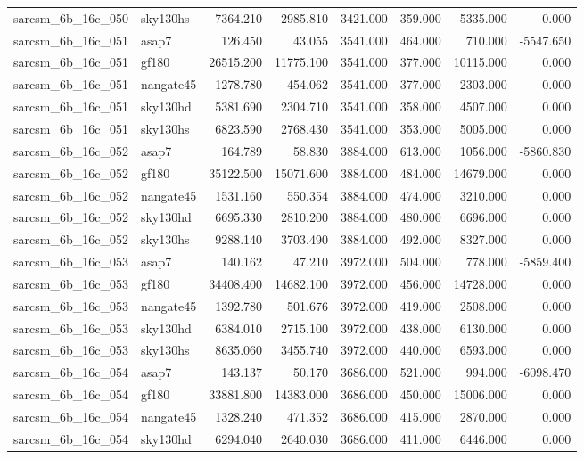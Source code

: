\begin{tabular}{llrrrrrr}
sarcsm\_6b\_16c\_050 & sky130hs & 7364.210 & 2985.810 & 3421.000 & 359.000 & 5335.000 & 0.000 \\
sarcsm\_6b\_16c\_051 & asap7 & 126.450 & 43.055 & 3541.000 & 464.000 & 710.000 & -5547.650 \\
sarcsm\_6b\_16c\_051 & gf180 & 26515.200 & 11775.100 & 3541.000 & 377.000 & 10115.000 & 0.000 \\
sarcsm\_6b\_16c\_051 & nangate45 & 1278.780 & 454.062 & 3541.000 & 377.000 & 2303.000 & 0.000 \\
sarcsm\_6b\_16c\_051 & sky130hd & 5381.690 & 2304.710 & 3541.000 & 358.000 & 4507.000 & 0.000 \\
sarcsm\_6b\_16c\_051 & sky130hs & 6823.590 & 2768.430 & 3541.000 & 353.000 & 5005.000 & 0.000 \\
sarcsm\_6b\_16c\_052 & asap7 & 164.789 & 58.830 & 3884.000 & 613.000 & 1056.000 & -5860.830 \\
sarcsm\_6b\_16c\_052 & gf180 & 35122.500 & 15071.600 & 3884.000 & 484.000 & 14679.000 & 0.000 \\
sarcsm\_6b\_16c\_052 & nangate45 & 1531.160 & 550.354 & 3884.000 & 474.000 & 3210.000 & 0.000 \\
sarcsm\_6b\_16c\_052 & sky130hd & 6695.330 & 2810.200 & 3884.000 & 480.000 & 6696.000 & 0.000 \\
sarcsm\_6b\_16c\_052 & sky130hs & 9288.140 & 3703.490 & 3884.000 & 492.000 & 8327.000 & 0.000 \\
sarcsm\_6b\_16c\_053 & asap7 & 140.162 & 47.210 & 3972.000 & 504.000 & 778.000 & -5859.400 \\
sarcsm\_6b\_16c\_053 & gf180 & 34408.400 & 14682.100 & 3972.000 & 456.000 & 14728.000 & 0.000 \\
sarcsm\_6b\_16c\_053 & nangate45 & 1392.780 & 501.676 & 3972.000 & 419.000 & 2508.000 & 0.000 \\
sarcsm\_6b\_16c\_053 & sky130hd & 6384.010 & 2715.100 & 3972.000 & 438.000 & 6130.000 & 0.000 \\
sarcsm\_6b\_16c\_053 & sky130hs & 8635.060 & 3455.740 & 3972.000 & 440.000 & 6593.000 & 0.000 \\
sarcsm\_6b\_16c\_054 & asap7 & 143.137 & 50.170 & 3686.000 & 521.000 & 994.000 & -6098.470 \\
sarcsm\_6b\_16c\_054 & gf180 & 33881.800 & 14383.000 & 3686.000 & 450.000 & 15006.000 & 0.000 \\
sarcsm\_6b\_16c\_054 & nangate45 & 1328.240 & 471.352 & 3686.000 & 415.000 & 2870.000 & 0.000 \\
sarcsm\_6b\_16c\_054 & sky130hd & 6294.040 & 2640.030 & 3686.000 & 411.000 & 6446.000 & 0.000 \\

\end{tabular}
